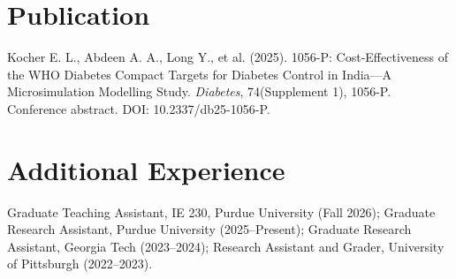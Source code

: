 \documentclass[letterpaper,10pt]{article}
\begin{document}
\section{Publication}
Kocher E. L., Abdeen A. A., Long Y., et al. (2025). 1056-P: Cost-Effectiveness of the WHO Diabetes Compact Targets for Diabetes Control in India---A Microsimulation Modelling Study. \textit{Diabetes}, 74(Supplement 1), 1056-P. Conference abstract. DOI: 10.2337/db25-1056-P.
\section{Additional Experience}
Graduate Teaching Assistant, IE 230, Purdue University (Fall 2026); Graduate Research Assistant, Purdue University (2025--Present); Graduate Research Assistant, Georgia Tech (2023--2024); Research Assistant and Grader, University of Pittsburgh (2022--2023).
\end{document}
